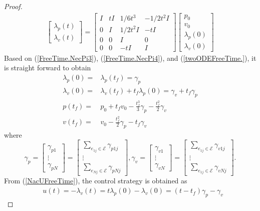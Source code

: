 \documentclass[12pt,draftcls,onecolumn]{IEEEtran}  %
\begin{document}
{\begin{proof}
\begin{align}
\begin{bmatrix}
\lambda_{p}(t)\\
\lambda_v(t)
\end{bmatrix}=\begin{bmatrix}
I&t I&1/6t^3&-1/2t^2I\\
0&I&1/2t^2I&-t I\\
0&0&I&0\\
0&0&-t I&I
\end{bmatrix}\begin{bmatrix}
p_0\\
v_0\\
\lambda_{p}(0)\\
\lambda_{v}(0)
\end{bmatrix}\label{twoODEFreeTime.}
\end{align}
Based on (\ref{FreeTime.NecPi3}), (\ref{FreeTime.NecPi4}), and (\ref{twoODEFreeTime.}), it is straight forward to obtain
\begin{align}
\lambda_p(0)=&\lambda_p(t_f) =\gamma_{p}\\
\lambda_v(0)=&\lambda_v(t_f)+t_f\lambda_p(0) =\gamma_{v}+t_f\gamma_p\\
p(t_f)=&p_0+t_fv_0-\frac{t_f^3}{3}\gamma_{p} -\frac{t_f^2}{2}\gamma_v\label{ptfFreeTime.}\\
v(t_f)=&v_0-\frac{t_f^2}{2}\gamma_{p} -t_f\gamma_v\label{vtfFreeTime.}
\end{align}
where
\[\gamma_p=\begin{bmatrix}
\gamma_{p1}\\
\vdots\\
\gamma_{pN}
\end{bmatrix}=\begin{bmatrix}
\sum_{e_{1j}\in{\mathcal{E}}}\gamma_{p1j}\\
\vdots\\
\sum_{e_{Nj}\in{\mathcal{E}}}\gamma_{pNj}
\end{bmatrix},
\gamma_v=\begin{bmatrix}
\gamma_{v1}\\
\vdots\\
\gamma_{vN}
\end{bmatrix}=\begin{bmatrix}
\sum_{e_{1j}\in{\mathcal{E}}}\gamma_{v1j}\\
\vdots\\
\sum_{e_{1j}\in{\mathcal{E}}}\gamma_{vNj}
\end{bmatrix}.\]
From (\ref{NacUFreeTime}), the control strategy is obtained as
\begin{align}
&u(t)=-\lambda_v(t)=t\lambda_p(0)-\lambda_v(0) =(t-t_f)\gamma_p-\gamma_v\label{uFreeTime.}

\end{align}
\end{proof}}
\end{document}
